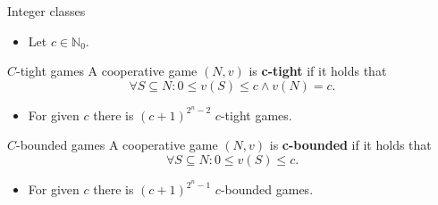 \documentclass{beamer}
\begin{document}


\begin{frame}{Integer classes}
    \pause

    \begin{itemize}
        \item Let $c \in \mathbb{N}_0$.
    \end{itemize}

    \pause
    
    \begin{block}{$C$-tight games}
        A cooperative game $(N,v)$ is \textbf{c-tight} if it holds that
        \begin{displaymath}
            \forall S \subseteq N: 0 \leq v(S) \leq c \land v(N) = c.
        \end{displaymath}
    \end{block}

    \pause

    \begin{itemize}
        \item For given $c$ there is $(c+1)^{2^n - 2}$ $c$-tight games.
    \end{itemize}

    \pause
   
    \begin{block}{$C$-bounded games}
        A cooperative game $(N,v)$ is \textbf{c-bounded} if it holds that
        \begin{displaymath}
            \forall S \subseteq N: 0 \leq v(S) \leq c.
        \end{displaymath}
    \end{block}

    \pause

    \begin{itemize}
        \item For given $c$ there is $(c+1)^{2^n - 1}$ $c$-bounded games.
    \end{itemize}

\end{frame}


\end{document}
